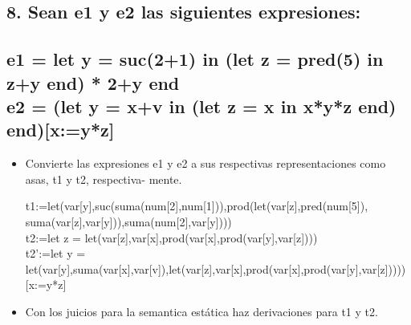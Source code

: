 \documentclass[11pt, a4paper]{report}
\begin{document}
\begin{enumerate}[label=\alph*)]
\section*{8. Sean e1 y e2 las siguientes expresiones: \\ \\ e1 = let y = suc(2+1) in (let z = pred(5) in z+y end) * 2+y end \\ e2 = (let y = x+v in (let z = x in x*y*z end) end)[x:=y*z]}
\begin{itemize}
\item Convierte las expresiones e1 y e2 a sus respectivas representaciones como asas, t1 y t2, respectiva-
mente.

t1:=let(var[y],suc(suma(num[2],num[1])),prod(let(var[z],pred(num[5]),\\suma(var[z],var[y])),suma(num[2],var[y])))\\
t2:=let z = let(var[z],var[x],prod(var[x],prod(var[y],var[z])))\\ 
t2':=let y = let(var[y],suma(var[x],var[v]),let(var[z],var[x],prod(var[x],prod(var[y],var[z]))))
[x:=y*z]

\item Con los juicios para la semantica est\'atica haz derivaciones para t1 y t2.


\end{itemize}
\end{enumerate}
\end{document}
